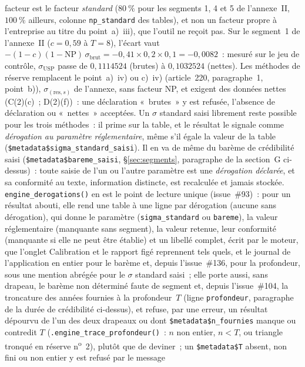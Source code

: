 \documentclass[a4paper,11pt]{article}
\newcommand{\code}[1]{\texttt{\small #1}}
\begin{document}
\begin{encadre}
facteur est le facteur \emph{standard} ($80~\%$ pour les segments 1, 4
et 5 de l'annexe~II, $100~\%$ ailleurs, colonne \code{np\_standard} des tables), et non un
facteur propre à l'entreprise au titre du point~a)~iii), que l'outil ne reçoit pas. Sur le
segment~1 de l'annexe~II ($c = 0{,}59$ à $T = 8$), l'écart vaut
$-(1-c)(1-\mathrm{NP})\,\sigma_{\text{brut}} = -0{,}41 \times 0{,}2 \times 0{,}1 = -0{,}0082$~:
mesuré sur le jeu de contrôle, $\sigma_{\mathrm{USP}}$ passe de $0{,}1114524$ (brutes) à
$0{,}1032524$ (nettes). Les méthodes de réserve remplacent le point~a)~iv) ou c)~iv)
(article~220, paragraphe~1, point~b)),
$\sigma_{(\text{res},s)}$ de l'annexe, sans facteur NP, et exigent des données nettes
(C(2)(c)~; D(2)(f))~: une déclaration «~brutes~» y est refusée, l'absence de déclaration
ou «~nettes~» acceptées. Un $\sigma$ standard saisi librement reste possible pour les trois
méthodes~: il prime sur la table, et le résultat le signale comme \emph{dérogation au paramètre
réglementaire}, même s'il égale la valeur de la table (\code{\$metadata\$sigma\_standard\_saisi}).
Il en va de même du barème de crédibilité saisi (\code{\$metadata\$bareme\_saisi},
§\ref{sec:segments}, paragraphe de la section~G ci-dessus)~: toute saisie de l'un ou l'autre
paramètre est une \emph{dérogation déclarée}, et sa conformité au texte, information distincte,
est recalculée et jamais stockée. \code{engine\_derogations()} en est le point de lecture unique
(issue~\#93)~: pour un résultat abouti, elle rend une table à une ligne par dérogation (aucune
sans dérogation), qui donne le paramètre (\code{sigma\_standard} ou \code{bareme}), la valeur
réglementaire (manquante sans segment), la valeur retenue, leur conformité (manquante si elle ne
peut être établie) et un libellé complet, écrit par le moteur, que l'onglet Calibration et le
rapport figé reprennent tels quels, et le journal de l'application en entier pour le barème et,
depuis l'issue~\#136, pour la profondeur, sous une mention abrégée pour le $\sigma$ standard
saisi~; elle porte aussi, sans
drapeau, le barème non déterminé faute de segment et, depuis l'issue~\#104, la troncature des
années fournies à la profondeur~$T$ (ligne \code{profondeur}, paragraphe de la durée de
crédibilité ci-dessus), et refuse, par une erreur, un résultat dépourvu de l'un des deux drapeaux
ou dont \code{\$metadata\$n\_fournies} manque ou contredit $T$ (\code{.engine\_trace\_profondeur()}~:
$n$ non entier, $n < T$, ou triangle tronqué en réserve n\textsuperscript{o}~2), plutôt que de
deviner~; un \code{\$metadata\$T} absent, non fini ou non entier y est refusé par le message

\end{encadre}
\end{document}
